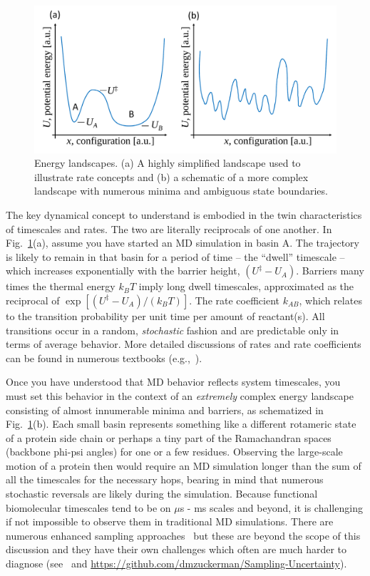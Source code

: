\documentclass[9pt,bestpractices]{livecoms}
\begin{document}
\begin{figure}[h]
\centering
\includegraphics[width=\linewidth]{simplelandscapes.pdf}
\caption{Energy landscapes.  (a) A highly simplified landscape used to illustrate rate concepts and (b) a schematic of a more complex landscape with numerous minima and ambiguous state boundaries.}
\label{landscapes}
\end{figure}

The key dynamical concept to understand is embodied in the twin characteristics of timescales and rates.  
The two are literally reciprocals of one another.  
In Fig.\ \ref{landscapes}(a), assume you have started an MD simulation in basin A.  
The trajectory is likely to remain in that basin for a period of time -- the ``dwell'' timescale -- which increases exponentially with the barrier height, $(U^\ddagger - U_A)$. 
Barriers many times the thermal energy $k_BT$ imply long dwell timescales, approximated as the reciprocal of $\exp[(U^\ddagger - U_A)/(k_B T)]$. 
The rate coefficient $k_{AB}$, which relates to the transition probability per unit time per amount of reactant(s).
All transitions occur in a random, \emph{stochastic} fashion and are predictable only in terms of average behavior.  
More detailed discussions of rates and rate coefficients can be found in numerous textbooks (e.g.,~\cite{DillBook, Zuckerman:2010:}).

Once you have understood that MD behavior reflects system timescales, you must set this behavior in the context of an \emph{extremely} complex energy landscape consisting of almost innumerable minima and barriers, as schematized in Fig.\ \ref{landscapes}(b).  
Each small basin represents something like a different rotameric state of a protein side chain or perhaps a tiny part of the Ramachandran spaces (backbone phi-psi angles) for one or a few residues.  
Observing the large-scale motion of a protein then would require an MD simulation longer than the sum of all the timescales for the necessary hops, bearing in mind that numerous stochastic reversals are likely during the simulation.  
Because functional biomolecular timescales tend to be on $\mu$s - ms scales and beyond, it is challenging if not impossible to observe them in traditional MD simulations.  
There are numerous enhanced sampling approaches~\cite{Zuckerman:2011:AnnuRevBiophys, Chong:2017:CurrentOpinioninStructuralBiology} but these are beyond the scope of this discussion and they have their own challenges which often are much harder to diagnose (see~\cite{Grossfield:2009:AnnuRepComputChem} and  \url{https://github.com/dmzuckerman/Sampling-Uncertainty}).
\end{document}
